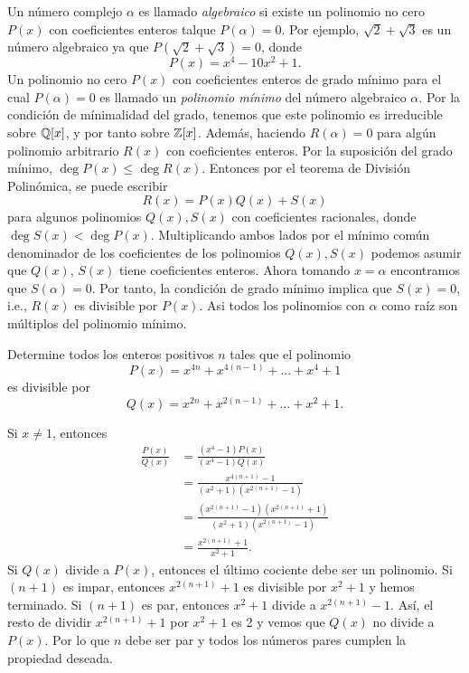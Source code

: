 Un número complejo $\alpha$ es llamado \textit{algebraico}  si existe un polinomio no cero $P(x)$ con coeficientes enteros talque $P(\alpha) = 0$.
Por ejemplo, $\sqrt {2} + \sqrt {3}$ es un número algebraico ya que $P\left(\sqrt {2} + \sqrt {3}\right) = 0$, donde
\[
    P(x) = x^4 - 10x^2 + 1.
\]
Un polinomio no cero $P(x)$ con coeficientes enteros de grado mínimo para el cual $P(\alpha) = 0$ es llamado un \textit{polinomio mínimo}  del número algebraico $\alpha$.
Por la condición de mínimalidad del grado, tenemos que este polinomio es irreducible sobre $\mathbb{Q}[x]$, y por tanto sobre $\mathbb{Z}[x]$.
Además, haciendo $R(\alpha) = 0$ para algún polinomio arbitrario $R(x)$ con coeficientes enteros.
Por la suposición del grado mínimo, $\deg{P(x)} \leq \deg{R(x)}$.
Entonces por el teorema de División Polinómica, se puede escribir
\[
    R(x) = P(x) Q(x) + S(x)
\]
para algunos polinomios $Q(x), S(x)$ con coeficientes racionales, donde $\deg{S(x)} < \deg{P(x)}$.
Multiplicando ambos lados por el mínimo común denominador de los coeficientes de los polinomios $Q(x), S(x)$ podemos asumir que $Q(x)$, $S(x)$ tiene coeficientes enteros.
Ahora tomando $x = \alpha$ encontramos que $S(\alpha) = 0$.
Por tanto, la condición de grado mínimo implica que $S(x) = 0$, i.e., $R(x)$ es divisible por $P(x)$.
Asi todos los polinomios con $\alpha$ como raíz son múltiplos del polinomio mínimo.

\begin{example}
    Determine todos los enteros positivos $n$ tales que el polinomio
    \[
        P(x) = x^{4n} + x^{4(n - 1)} + \ldots + x^4 + 1
    \]
    es divisible por
    \[
        Q(x) = x^{2n} + x^{2(n - 1)} + \ldots + x^2 + 1.
    \]
\end{example}
\begin{solution}
    Si $x \neq 1$, entonces
    \begin{align*}
        \frac{P(x)}{Q(x)} &= \frac{(x^4 - 1) P(x)}{(x^4 - 1) Q(x)}\\
        &= \frac{x^{4(n + 1)} - 1}{(x^2 + 1)(x^{2(n + 1)} - 1)}\\[2mm]
        &= \frac{(x^{2(n + 1)} - 1)(x^{2(n + 1)} + 1)}{(x^2 + 1)(x^{2(n + 1)} - 1)}\\[2mm]
        &= \frac{x^{2(n + 1)} + 1}{x^2 + 1}.
    \end{align*}
    Si $Q(x)$ divide a $P(x)$, entonces el último cociente debe ser un polinomio.
    Si $(n + 1)$ es impar, entonces $x^{2(n + 1)} + 1$ es divisible por $x^2 + 1$ y hemos terminado.
    Si $(n + 1)$ es par, entonces $x^2 + 1$ divide a $x^{2(n + 1)} - 1$.
    Así, el resto de dividir $x^{2(n + 1)} + 1$ por $x^2 + 1$ es 2 y vemos que $Q(x)$ no divide a $P(x)$.
    Por lo que $n$ debe ser par y todos los números pares cumplen la propiedad deseada.
\end{solution}

